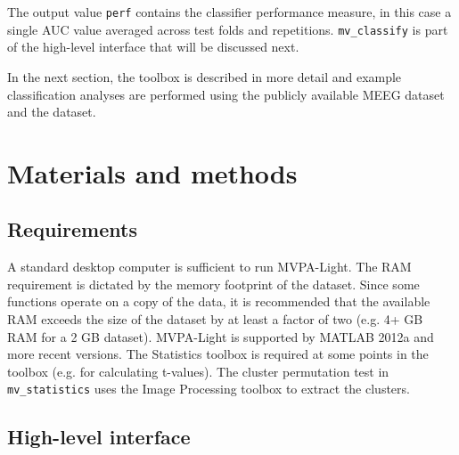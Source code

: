 \documentclass[utf8]{frontiersSCNS} %
\newcommand{\ttt}[1]{\texttt{#1}}
\begin{document}
The output value \ttt{perf} contains the classifier performance measure, in this case a single AUC value averaged across test folds and repetitions. \ttt{mv\_classify} is part of the high-level interface that will be discussed next.

In the next section, the toolbox is described in more detail and example classification analyses are performed using the publicly available \cite{Wakeman2014OpenfMRI,Wakeman2015ADataset} MEEG dataset and the \cite{Haxby2001} dataset.

\section{Materials and methods}

\subsection{Requirements}

A standard desktop computer is sufficient to run MVPA-Light. The RAM requirement is dictated by the memory footprint of the dataset. Since some functions operate on a copy of the data, it is recommended that the available RAM exceeds the size of the dataset by at least a factor of two (e.g. 4+ GB RAM for a 2 GB dataset). MVPA-Light is supported by MATLAB 2012a and more recent versions. The Statistics toolbox is required at some points in the toolbox (e.g. for calculating t-values). The cluster permutation test in \ttt{mv\_statistics} uses the Image Processing toolbox to extract the clusters.

\subsection{High-level interface}
\end{document}
